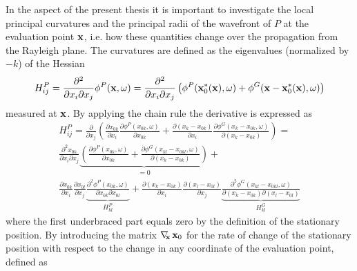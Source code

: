 In the aspect of the present thesis it is important to investigate the local principal curvatures and the principal radii of the wavefront of $P$ at the evaluation point $\mathbf{x}$, i.e. how these quantities change over the propagation from the Rayleigh plane. 
The curvatures are defined as the eigenvalues (normalized by $-k$) of the Hessian 
\begin{equation}
H_{ij}^P = \frac{\partial^2}{\partial x_{i} \partial x_{j}} \phi^P ( \mathbf{x},\omega) = \frac{\partial^2}{\partial x_{i} \partial x_{j}}\left( \phi^P(\mathbf{x}_0^*(\mathbf{x}),\omega) + \phi^G(\mathbf{x}-\mathbf{x}_0^*(\mathbf{x}),\omega) \right) 
\end{equation}
measured at $\mathbf{x}$.
By applying the chain rule the derivative is expressed as
\begin{multline}
H_{ij}^P 
= 
\frac{\partial}{\partial x_{j}} \left( \frac{\partial x_{0 k}}{\partial x_{i} } \frac{\partial \phi^P(x_{0 k},\omega)}{\partial x_{0 k} } + 
\frac{\partial ( x_k - x_{0 k}) }{\partial x_{i} }  \frac{\partial \phi^G(x_k-x_{0 k},\omega)}{\partial( x_k - x_{0 k}) }   \right) = \\
\frac{\partial^2 x_{0 k}}{\partial x_{i} \partial x_{j}} 
\underbrace{
\left( \frac{\partial \phi^P(x_{0 k},\omega)}{\partial x_{0 k} } 
+ \frac{\partial \phi^G(x_{kl}-x_{0 kl},\omega)}{\partial( x_k - x_{0 k}) } \right)}_{ = 0} +
\\ 
 \frac{\partial x_{0 k}}{\partial x_{i} } \frac{\partial x_{0 l}}{\partial x_{j}} 
\underbrace{ \frac{\partial^2 \phi^P(x_{0 k},\omega)}{\partial x_{0 k}\partial x_{0 l} }}_{H^P_{kl}}
+  \frac{\partial ( x_{k} - x_{0 k}) }{\partial x_{i} } 
 \frac{\partial ( x_{l} - x_{0 l}) }{\partial x_{j} }
\underbrace{ \frac{\partial^2 \phi^G(x_{kl}-x_{0 kl},\omega)}{\partial( x_k - x_{0 k}) \partial ( x_{l} - x_{0 l})} }_{H^G_{kl}} 
\end{multline}
where the first underbraced part equals zero by the definition of the stationary position.
By introducing the matrix $\nabla_{\!\!\mathbf{x}}\, \mathbf{x}_0$ for the rate of change of the stationary position with respect to the change in any coordinate of the evaluation point, defined as
